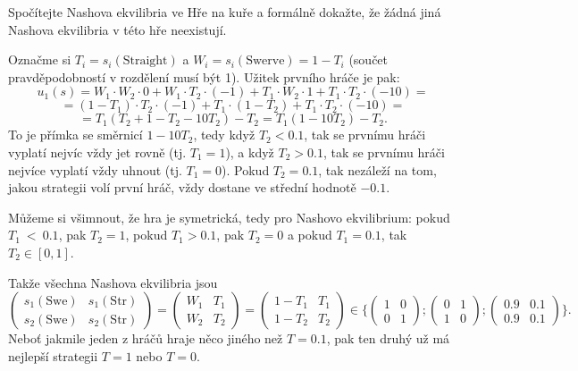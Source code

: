 \documentclass[12pt]{article}					%
\begin{document}
\begin{priklad}[1.1]
	Spočítejte Nashova ekvilibria ve Hře na kuře a formálně dokažte, že žádná jiná Nashova ekvilibria v této hře neexistují.

	\begin{reseni}
		Označme si $T_i = s_i(\text{Straight})$ a $W_i = s_i(\text{Swerve}) = 1 - T_i$ (součet pravděpodobností v rozdělení musí být 1). Užitek prvního hráče je pak:
		$$ u_1(s) = W_1·W_2·0 + W_1·T_2·(-1) + T_1·W_2·1 + T_1·T_2·(-10) = $$
		$$ = (1 - T_1)·T_2·(-1) + T_1·(1 - T_2) + T_1·T_2·(-10) = $$
		$$ = T_1(T_2 + 1 - T_2 - 10 T_2) - T_2 = T_1(1 - 10T_2) - T_2. $$
		To je přímka se směrnicí $1 - 10T_2$, tedy když $T_2 < 0.1$, tak se prvnímu hráči vyplatí nejvíc vždy jet rovně (tj. $T_1 = 1$), a když $T_2 > 0.1$, tak se prvnímu hráči nejvíce vyplatí vždy uhnout (tj. $T_1 = 0$). Pokud $T_2 = 0.1$, tak nezáleží na tom, jakou strategii volí první hráč, vždy dostane ve střední hodnotě $-0.1$.

		Můžeme si všimnout, že hra je symetrická, tedy pro Nashovo ekvilibrium: pokud $T_1~<~0.1$, pak $T_2 = 1$, pokud $T_1 > 0.1$, pak $T_2 = 0$ a pokud $T_1 = 0.1$, tak $T_2 \in [0, 1]$.

		Takže všechna Nashova ekvilibria jsou
		$$ \begin{pmatrix} s_1(\text{Swe}) & s_1(\text{Str}) \\ s_2(\text{Swe}) & s_2(\text{Str}) \end{pmatrix} = \begin{pmatrix} W_1 & T_1 \\ W_2 & T_2 \end{pmatrix} = \begin{pmatrix} 1 - T_1 & T_1 \\ 1 - T_2 & T_2 \end{pmatrix} \in \{\begin{pmatrix} 1 & 0 \\ 0 & 1 \end{pmatrix}; \begin{pmatrix} 0 & 1 \\ 1 & 0 \end{pmatrix}; \begin{pmatrix} 0.9 & 0.1 \\ 0.9 & 0.1 \end{pmatrix}\}. $$
		Neboť jakmile jeden z hráčů hraje něco jiného než $T=0.1$, pak ten druhý už má nejlepší strategii $T = 1$ nebo $T = 0$.
	\end{reseni}
\end{priklad}
\end{document}
